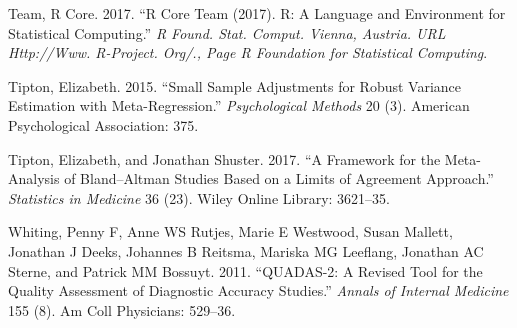 \documentclass[smallextended]{svjour3}       %
\begin{document}
\leavevmode\hypertarget{ref-team2017r}{}%
Team, R Core. 2017. ``R Core Team (2017). R: A Language and Environment
for Statistical Computing.'' \emph{R Found. Stat. Comput. Vienna,
Austria. URL Http://Www. R-Project. Org/., Page R Foundation for
Statistical Computing}.

\leavevmode\hypertarget{ref-tipton2015small}{}%
Tipton, Elizabeth. 2015. ``Small Sample Adjustments for Robust Variance
Estimation with Meta-Regression.'' \emph{Psychological Methods} 20 (3).
American Psychological Association: 375.

\leavevmode\hypertarget{ref-tipton2017framework}{}%
Tipton, Elizabeth, and Jonathan Shuster. 2017. ``A Framework for the
Meta-Analysis of Bland--Altman Studies Based on a Limits of Agreement
Approach.'' \emph{Statistics in Medicine} 36 (23). Wiley Online Library:
3621--35.

\leavevmode\hypertarget{ref-whiting2011quadas}{}%
Whiting, Penny F, Anne WS Rutjes, Marie E Westwood, Susan Mallett,
Jonathan J Deeks, Johannes B Reitsma, Mariska MG Leeflang, Jonathan AC
Sterne, and Patrick MM Bossuyt. 2011. ``QUADAS-2: A Revised Tool for the
Quality Assessment of Diagnostic Accuracy Studies.'' \emph{Annals of
Internal Medicine} 155 (8). Am Coll Physicians: 529--36.



\end{document}
